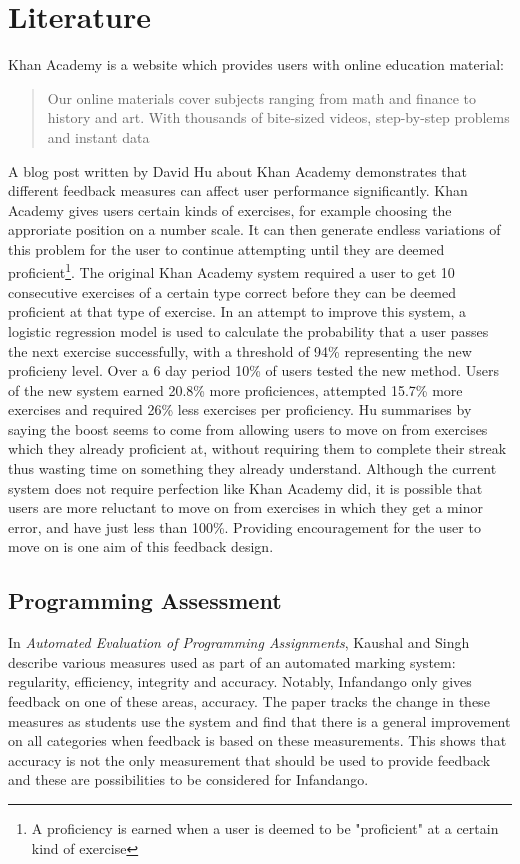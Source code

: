 \section{Literature}
Khan Academy\cite{khan_site} is a website which provides users with online education material:
\begin{quote}
Our online materials cover subjects ranging from math and finance to history and art.  With thousands of bite-sized videos, step-by-step problems and instant data\cite{ka_faq}
\end{quote}


A blog post\cite{khan_blog} written by David Hu about Khan Academy demonstrates that different feedback measures can affect user performance significantly. Khan Academy gives users certain kinds of exercises, for example choosing the approriate position on a number scale. It can then generate endless variations of this problem for the user to continue attempting until they are deemed proficient\footnote{
A proficiency is earned when a user is deemed to be "proficient" at a certain kind of exercise
}. The original Khan Academy system required a user to get 10 consecutive exercises of a certain type correct before they can be deemed proficient at that type of exercise. In an attempt to improve this system, a logistic regression model is used to calculate the probability that a user passes the next exercise successfully, with a threshold of 94\% representing the new proficieny level. Over a 6 day period 10\% of users tested the new method. Users of the new system earned 20.8\% more proficiences, attempted 15.7\% more exercises and required 26\% less exercises per proficiency. Hu summarises by saying the boost seems to come from allowing users to move on from exercises which they already proficient at, without requiring them to complete their streak thus wasting time on something they already understand.
Although the current system does not require perfection like Khan Academy did, it is possible that users are more reluctant to move on from exercises in which they get a minor error, and have just less than 100\%. Providing encouragement for the user to move on is one aim of this feedback design.
\subsection{Programming Assessment}
In {\it Automated Evaluation of Programming Assignments}\cite{automate_evaluation}, Kaushal and Singh describe various measures used as part of an automated marking system: regularity, efficiency, integrity and accuracy. Notably, Infandango only gives feedback on one of these areas, accuracy. The paper tracks the change in these measures as students use the system and find that there is a general improvement on all categories when feedback is based on these measurements. This shows that accuracy is not the only measurement that should be used to provide feedback and these are possibilities to be considered for Infandango.
